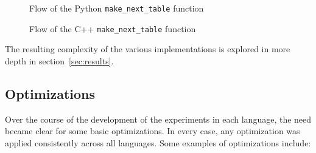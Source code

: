 \begin{figure}[ht]
\centering
\begin{minipage}[t]{0.45\textwidth}
\centering

\caption{Flow of the Python \texttt{make\_next\_table} function}
\label{fig:graph-kmp-py}
\end{minipage}\hfill
\begin{minipage}[t]{0.45\textwidth}
\centering

\caption{Flow of the C++ \texttt{make\_next\_table} function}
\label{fig:graph-kmp-cpp}
\end{minipage}
\end{figure}

The resulting complexity of the various implementations is explored in more depth in section~\ref{sec:results}.

\subsection{Optimizations}

Over the course of the development of the experiments in each language, the need became clear for some basic optimizations. In every case, any optimization was applied consistently across all languages. Some examples of optimizations include:

